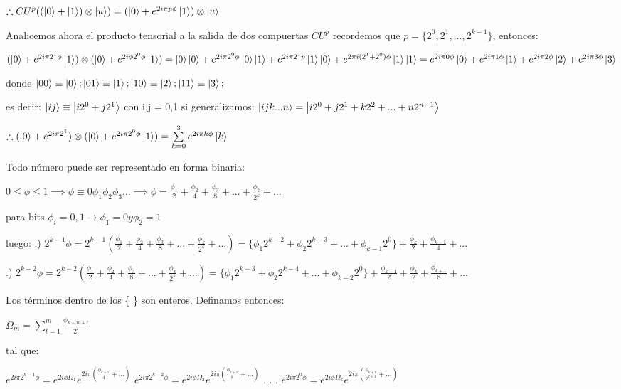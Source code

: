 \documentclass[11pt, spanish]{report}
\begin{document}
$\therefore CU^p ((\ket{0} + \ket{1}) \otimes \ket{u}) = (\ket{0} + e^{2 i \pi p \phi} \ket{1}) \otimes \ket{u}$

Analicemos ahora el producto tensorial a la salida de dos compuertas $CU^p$ recordemos que $p = \{2^0, 2^1, ..., 2^{k-1}\}$, entonces:

$(\ket{0} + e^{2 i \pi 2^1 \phi} \ket{1}) \otimes (\ket{0} + e^{2 i \phi 2^0 \phi} \ket{1}) = \ket{0} \ket{0} + e^{2 i \pi 2^0 \phi} \ket{0} \ket{1} + e^{2 i \pi 2^1 p} \ket{1} \ket{0} + e^{2 \pi i (2^1 + 2^0) \phi} \ket{1} \ket{1} = e^{2 i \pi 0 \phi} \ket{0} + e^{2 i \pi 1 \phi} \ket{1} + e^{2 i \pi 2 \phi} \ket{2} + e^{2 i \pi 3 \phi} \ket{3}$

donde $\ket{00} \equiv \ket{0}; \ket{01} \equiv \ket{1}; \ket{10} \equiv \ket{2}; \ket{11} \equiv \ket{3};$

es decir: $\ket{ij} \equiv \ket{i 2^0 + j 2^1}$ con i,j = 0,1
si generalizamos: $\ket{i j k ... n} = \ket{i 2^0 + j 2^1 + k 2^2 + ... + n 2^{n-1}}$

$\therefore (\ket{0} + e^{2 i \pi 2^1}) \otimes (\ket{0} + e^{2 i \pi 2^0 \phi} \ket{1}) = \sum\limits_{k = 0}^3 e^{2i \pi k \phi} \ket{k}$

Todo número puede ser representado en forma binaria:

$0 \leq \phi \leq 1 \implies \phi \equiv 0 \phi_1 \phi_2 \phi_3 ... \implies \phi = \frac{\phi_1}{2} + \frac{\phi_2}{4} + \frac{\phi_3}{8} + ... + \frac{\phi_k}{2^k} + ...$

para bits $\phi_i = 0,1 \rightarrow \phi_1 = 0 y \phi_2 = 1$

luego: .) $2^{k-1} \phi = 2^{k-1} ( \frac{\phi_1}{2} + \frac{\phi_2}{4} + \frac{\phi_3}{8} + ... + \frac{\phi_k}{2^k} + ...) = \{\phi_1 2^{k-2} + \phi_2 2^{k-3} + ... + \phi_{k-1} 2^0\} + \frac{\phi_k}{2} + \frac{\phi_{k-1}}{4} + ...$

.) $2^{k-2} \phi = 2^{k-2} ( \frac{\phi_1}{2} + \frac{\phi_2}{4} + \frac{\phi_3}{8} + ... + \frac{\phi_k}{2^k} + ...) = \{\phi_1 2^{k-3} + \phi_2 2^{k-4} + ... + \phi_{k-2} 2^0\} + \frac{\phi_{k-1}}{2} + \frac{\phi_k}{2} + \frac{\phi_{k+1}}{8} + ...$

Los términos dentro de los \{ \} son enteros. Definamos entonces:

$\Omega_m = \sum\limits_{l=1}^m \frac{\phi_{k-m+l}}{2^l}$

tal que:

$e^{2 i \pi 2^{k-1} \phi} = e^{2 i \phi \Omega_1} e^{2 i \pi (\frac{\phi_{k+1}}{4} + ...)}$
$e^{2 i \pi 2^{k-2} \phi} = e^{2 i \phi \Omega_2} e^{2 i \pi (\frac{\phi_{k+1}}{8} + ...)}$
.
.
.
$e^{2 i \pi 2^0 \phi} = e^{2 i \phi \Omega_k} e^{2 i \pi (\frac{\phi_{k+1}}{2^{k+1}} + ...)}$
\end{document}
